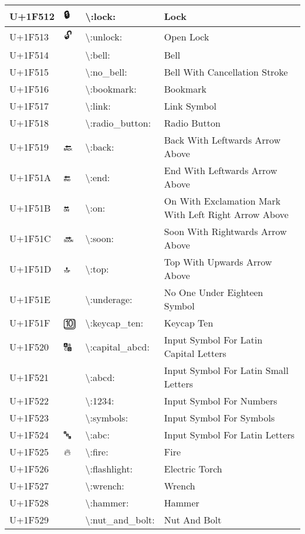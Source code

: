 \begin{table}[h]
\begin{tabulary}{\linewidth}{|L|L|L|L|}
\hline
U+1F512 & 🔒 & {\textbackslash}:lock: & Lock \\
\hline
U+1F513 & 🔓 & {\textbackslash}:unlock: & Open Lock \\
\hline
U+1F514 & 🔔 & {\textbackslash}:bell: & Bell \\
\hline
U+1F515 & 🔕 & {\textbackslash}:no\_bell: & Bell With Cancellation Stroke \\
\hline
U+1F516 & 🔖 & {\textbackslash}:bookmark: & Bookmark \\
\hline
U+1F517 & 🔗 & {\textbackslash}:link: & Link Symbol \\
\hline
U+1F518 & 🔘 & {\textbackslash}:radio\_button: & Radio Button \\
\hline
U+1F519 & 🔙 & {\textbackslash}:back: & Back With Leftwards Arrow Above \\
\hline
U+1F51A & 🔚 & {\textbackslash}:end: & End With Leftwards Arrow Above \\
\hline
U+1F51B & 🔛 & {\textbackslash}:on: & On With Exclamation Mark With Left Right Arrow Above \\
\hline
U+1F51C & 🔜 & {\textbackslash}:soon: & Soon With Rightwards Arrow Above \\
\hline
U+1F51D & 🔝 & {\textbackslash}:top: & Top With Upwards Arrow Above \\
\hline
U+1F51E & 🔞 & {\textbackslash}:underage: & No One Under Eighteen Symbol \\
\hline
U+1F51F & 🔟 & {\textbackslash}:keycap\_ten: & Keycap Ten \\
\hline
U+1F520 & 🔠 & {\textbackslash}:capital\_abcd: & Input Symbol For Latin Capital Letters \\
\hline
U+1F521 & 🔡 & {\textbackslash}:abcd: & Input Symbol For Latin Small Letters \\
\hline
U+1F522 & 🔢 & {\textbackslash}:1234: & Input Symbol For Numbers \\
\hline
U+1F523 & 🔣 & {\textbackslash}:symbols: & Input Symbol For Symbols \\
\hline
U+1F524 & 🔤 & {\textbackslash}:abc: & Input Symbol For Latin Letters \\
\hline
U+1F525 & 🔥 & {\textbackslash}:fire: & Fire \\
\hline
U+1F526 & 🔦 & {\textbackslash}:flashlight: & Electric Torch \\
\hline
U+1F527 & 🔧 & {\textbackslash}:wrench: & Wrench \\
\hline
U+1F528 & 🔨 & {\textbackslash}:hammer: & Hammer \\
\hline
U+1F529 & 🔩 & {\textbackslash}:nut\_and\_bolt: & Nut And Bolt \\

\end{tabulary}
\end{table}
